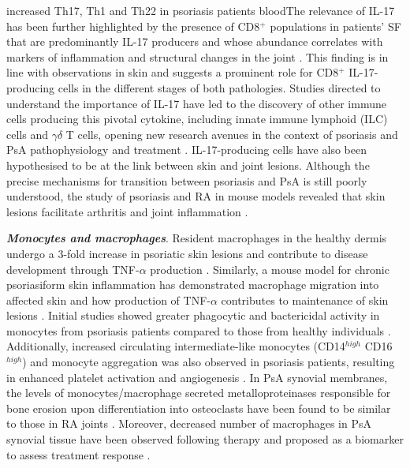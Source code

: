 increased Th17, Th1 and Th22 in psoriasis patients bloodThe relevance of IL-17 has been further highlighted by the presence of CD8$^+$ populations in patients’ SF that are predominantly IL-17 producers and whose abundance correlates with markers of inflammation and structural changes in the joint \parencite{Menon2014}. This finding is in line with observations in skin and suggests a prominent role for CD8$^+$ IL-17-producing cells in the different stages of both pathologies. Studies directed to understand the importance of IL-17 have led to the discovery of other immune cells producing this pivotal cytokine, including innate immune lymphoid (ILC) cells and $\gamma$$\delta$ T cells, opening new research avenues in the context of psoriasis and PsA pathophysiology and treatment \parencite{Meglio2014,Leijten2015}. IL-17-producing cells have also been hypothesised to be at the link between skin and joint lesions. Although the precise mechanisms for transition between psoriasis and PsA is still poorly understood, the study of psoriasis and RA in mouse models revealed that skin lesions facilitate arthritis and joint inflammation \parencite{Yamamoto2015}. %


\textbf{\textit{Monocytes and macrophages}}. Resident macrophages in the healthy dermis undergo a 3-fold increase in psoriatic skin lesions and contribute to disease development through TNF-$\alpha$ production \parencite{Perera2012, Mahil2016}. Similarly, a mouse model for chronic psoriasiform skin inflammation has demonstrated macrophage migration into affected skin and how production of TNF-$\alpha$ contributes to maintenance of skin lesions \parencite{Stratis2006, Wang2006}. Initial studies showed greater phagocytic and bactericidal activity in monocytes from psoriasis patients compared to those from healthy individuals \parencite{Bar-Eli1979}. Additionally, increased circulating intermediate-like monocytes (CD14$^{high}$ CD16$^{high}$) and monocyte aggregation was also observed in psoriasis patients, resulting in enhanced platelet activation and angiogenesis \parencite{Golden2015}. In PsA synovial membranes, the levels of monocytes/macrophage secreted metalloproteinases responsible for bone erosion upon differentiation into osteoclasts have been found to be similar to those in RA joints \parencite{Hitchon2002}. Moreover, decreased number of macrophages in PsA synovial tissue have been observed following therapy and proposed as a biomarker to assess treatment response \parencite{Canete2010}.


